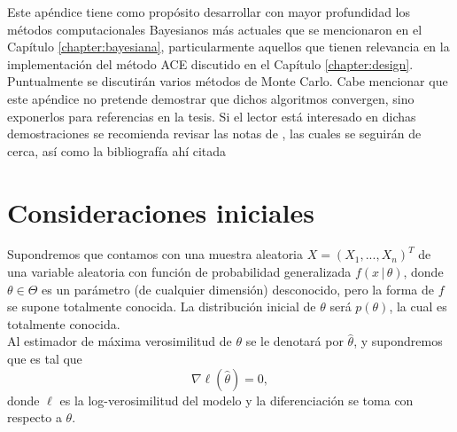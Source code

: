 Este apéndice tiene como propósito desarrollar con mayor profundidad los métodos computacionales Bayesianos más actuales que se mencionaron en el Capítulo \ref{chapter:bayesiana}, particularmente aquellos que tienen relevancia en la implementación del método ACE discutido en el Capítulo \ref{chapter:design}. Puntualmente se discutirán varios métodos de Monte Carlo. Cabe mencionar que este apéndice no pretende demostrar que dichos algoritmos convergen, sino exponerlos para referencias en la tesis. Si el lector está interesado en dichas demostraciones se recomienda revisar las notas de \cite{notas_mcmc_egp}, las cuales se seguirán de cerca, así como la bibliografía ahí citada \\




\section*{Consideraciones iniciales}

Supondremos que contamos con una muestra aleatoria $X = (X_1, ..., X_n)^T$ de una variable aleatoria con función de probabilidad generalizada $f(x \, | \, \theta)$, donde $\theta \in \Theta$ es un parámetro (de cualquier dimensión) desconocido, pero la forma de $f$ se supone totalmente conocida. La distribución inicial de $\theta$ será $p(\theta)$, la cual es totalmente conocida.\\

Al estimador de máxima verosimilitud de $\theta$ se le denotará por $\hat{\theta}$, y supondremos que es tal que
\begin{equation*}
	\nabla \ell (\hat{\theta}) = 0, 
\end{equation*}
donde $\ell$ es la log-verosimilitud del modelo y la diferenciación se toma con respecto a $\theta$. 



